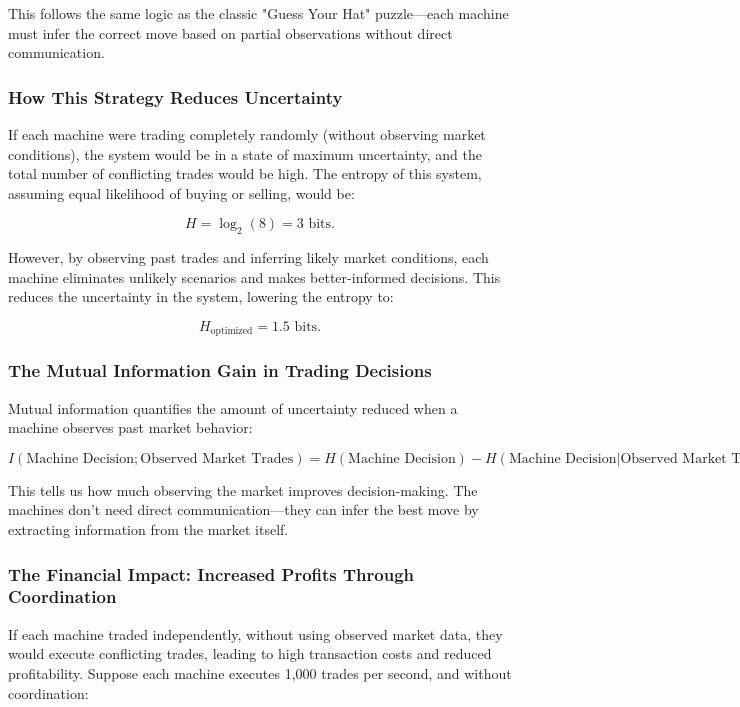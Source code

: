 This follows the same logic as the classic "Guess Your Hat" puzzle—each machine must infer the correct move based on partial observations without direct communication.  

\subsubsection*{How This Strategy Reduces Uncertainty}  

If each machine were trading completely randomly (without observing market conditions), the system would be in a state of maximum uncertainty, and the total number of conflicting trades would be high. The entropy of this system, assuming equal likelihood of buying or selling, would be:  

\[
H = \log_2(8) = 3 \text{ bits}.
\]  

However, by observing past trades and inferring likely market conditions, each machine eliminates unlikely scenarios and makes better-informed decisions. This reduces the uncertainty in the system, lowering the entropy to:  

\[
H_{\text{optimized}} = 1.5 \text{ bits}.
\]  

\subsubsection*{The Mutual Information Gain in Trading Decisions}  

Mutual information quantifies the amount of uncertainty reduced when a machine observes past market behavior:  

\[
I(\text{Machine Decision}; \text{Observed Market Trades}) = H(\text{Machine Decision}) - H(\text{Machine Decision} | \text{Observed Market Trades}).
\]  

This tells us how much observing the market improves decision-making. The machines don’t need direct communication—they can infer the best move by extracting information from the market itself.  

\subsubsection*{The Financial Impact: Increased Profits Through Coordination}  

If each machine traded independently, without using observed market data, they would execute conflicting trades, leading to high transaction costs and reduced profitability. Suppose each machine executes 1,000 trades per second, and without coordination:  

